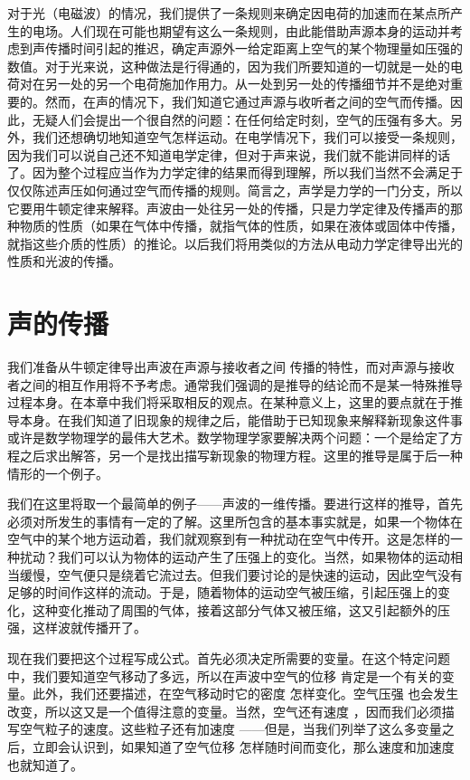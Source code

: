 对于光（电磁波）的情况，我们提供了一条规则来确定因电荷的加速而在某点所产生的电场。人们现在可能也期望有这么一条规则，由此能借助声源本身的运动并考虑到声传播时间引起的推迟，确定声源外一给定距离上空气的某个物理量如压强的数值。对于光来说，这种做法是行得通的，因为我们所要知道的一切就是一处的电荷对在另一处的另一个电荷施加作用力。从一处到另一处的传播细节并不是绝对重要的。然而，在声的情况下，我们知道它通过声源与收听者之间的空气而传播。因此，无疑人们会提出一个很自然的问题：在任何给定时刻，空气的压强有多大。另外，我们还想确切地知道空气怎样运动。在电学情况下，我们可以接受一条规则，因为我们可以说自己还不知道电学定律，但对于声来说，我们就不能讲同样的话了。因为整个过程应当作为力学定律的结果而得到理解，所以我们当然不会满足于仅仅陈述声压如何通过空气而传播的规则。简言之，声学是力学的一门分支，所以它要用牛顿定律来解释。声波由一处往另一处的传播，只是力学定律及传播声的那种物质的性质（如果在气体中传播，就指气体的性质，如果在液体或固体中传播，就指这些介质的性质）的推论。以后我们将用类似的方法从电动力学定律导出光的性质和光波的传播。

\section{声的传播}

我们准备从牛顿定律导出声波在声源与接收者之间 传播的特性，而对声源与接收者之间的相互作用将不予考虑。通常我们强调的是推导的结论而不是某一特殊推导过程本身。在本章中我们将采取相反的观点。在某种意义上，这里的要点就在于推导本身。在我们知道了旧现象的规律之后，能借助于已知现象来解释新现象这件事或许是数学物理学的最伟大艺术。数学物理学家要解决两个问题：一个是给定了方程之后求出解答，另一个是找出描写新现象的物理方程。这里的推导是属于后一种情形的一个例子。

我们在这里将取一个最简单的例子——声波的一维传播。要进行这样的推导，首先必须对所发生的事情有一定的了解。这里所包含的基本事实就是，如果一个物体在空气中的某个地方运动着，我们就观察到有一种扰动在空气中传开。这是怎样的一种扰动？我们可以认为物体的运动产生了压强上的变化。当然，如果物体的运动相当缓慢，空气便只是绕着它流过去。但我们要讨论的是快速的运动，因此空气没有足够的时间作这样的流动。于是，随着物体的运动空气被压缩，引起压强上的变化，这种变化推动了周围的气体，接着这部分气体又被压缩，这又引起额外的压强，这样波就传播开了。

现在我们要把这个过程写成公式。首先必须决定所需要的变量。在这个特定问题中，我们要知道空气移动了多远，所以在声波中空气的位移 肯定是一个有关的变量。此外，我们还要描述，在空气移动时它的密度 怎样变化。空气压强 也会发生改变，所以这又是一个值得注意的变量。当然，空气还有速度 ，因而我们必须描写空气粒子的速度。这些粒子还有加速度 ——但是，当我们列举了这么多变量之后，立即会认识到，如果知道了空气位移 怎样随时间而变化，那么速度和加速度也就知道了。

